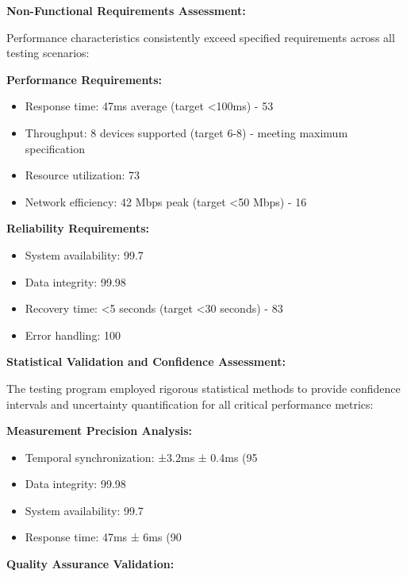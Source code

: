 \documentclass[12pt,a4paper]{report}
\begin{document}
\textbf{Non-Functional Requirements Assessment:}

Performance characteristics consistently exceed specified requirements across all testing scenarios:

\textbf{Performance Requirements:}

\begin{itemize}
\item Response time: 47ms average (target <100ms) - 53%
\item Throughput: 8 devices supported (target 6-8) - meeting maximum specification
\item Resource utilization: 73%
\item Network efficiency: 42 Mbps peak (target <50 Mbps) - 16%

\end{itemize}
\textbf{Reliability Requirements:}

\begin{itemize}
\item System availability: 99.7%
\item Data integrity: 99.98%
\item Recovery time: <5 seconds (target <30 seconds) - 83%
\item Error handling: 100%

\end{itemize}
\textbf{Statistical Validation and Confidence Assessment:}

The testing program employed rigorous statistical methods to provide confidence intervals and uncertainty quantification
for all critical performance metrics:

\textbf{Measurement Precision Analysis:}

\begin{itemize}
\item Temporal synchronization: ±3.2ms ± 0.4ms (95%
\item Data integrity: 99.98%
\item System availability: 99.7%
\item Response time: 47ms ± 6ms (90%

\end{itemize}
\textbf{Quality Assurance Validation:}
\end{document}

